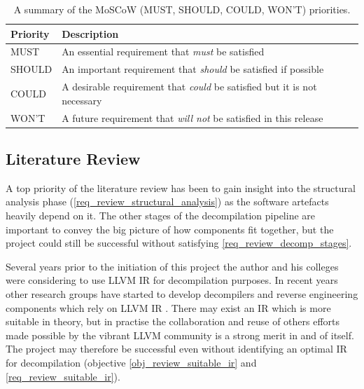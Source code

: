 \documentclass[12pt, a4paper]{article}
\begin{document}
\begin{table}[htbp]
	\begin{center}
		\begin{tabular}{|l|l|}
			\hline
			Priority & Description \\
			\hline
			MUST & An essential requirement that \textit{must} be satisfied \\
			SHOULD & An important requirement that \textit{should} be satisfied if possible \\
			COULD & A desirable requirement that \textit{could} be satisfied but it is not necessary \\
			WON'T & A future requirement that \textit{will not} be satisfied in this release \\
			\hline
		\end{tabular}
	\end{center}
	\caption{A summary of the MoSCoW (MUST, SHOULD, COULD, WON'T) priorities.}
	\label{MoSCoW_priorities}
\end{table}


\subsection{Literature Review}

A top priority of the literature review has been to gain insight into the structural analysis phase (\ref{req_review_structural_analysis}) as the software artefacts heavily depend on it. The other stages of the decompilation pipeline are important to convey the big picture of how components fit together, but the project could still be successful without satisfying \ref{req_review_decomp_stages}.

Several years prior to the initiation of this project the author and his colleges were considering to use LLVM IR for decompilation purposes. In recent years other research groups have started to develop decompilers and reverse engineering components which rely on LLVM IR \cite{decomp_llvm,retargetable_decomp,mcsema}. There may exist an IR which is more suitable in theory, but in practise the collaboration and reuse of others efforts made possible by the vibrant LLVM community is a strong merit in and of itself. The project may therefore be successful even without identifying an optimal IR for decompilation (objective \ref{obj_review_suitable_ir} and \ref{req_review_suitable_ir}).
\end{document}
